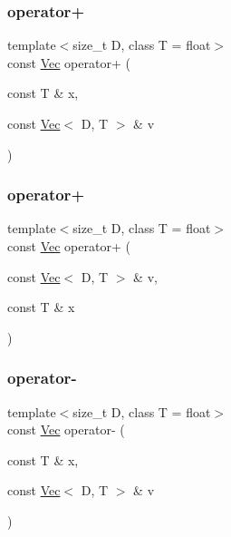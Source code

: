 \subsubsection{\texorpdfstring{operator+}{operator+}\hspace{0.1cm}{\footnotesize\ttfamily [1/2]}}
{\footnotesize\ttfamily template$<$size\+\_\+t D, class T = float$>$ \\
const \hyperlink{classtrimesh_1_1Vec}{Vec} operator+ (\begin{DoxyParamCaption}\item[{const T \&}]{x,  }\item[{const \hyperlink{classtrimesh_1_1Vec}{Vec}$<$ D, T $>$ \&}]{v }\end{DoxyParamCaption})\hspace{0.3cm}{\ttfamily [friend]}}

\mbox{\label{classtrimesh_1_1Vec_affd0d0de91f65f28142428beae224277}} 
\subsubsection{\texorpdfstring{operator+}{operator+}\hspace{0.1cm}{\footnotesize\ttfamily [2/2]}}
{\footnotesize\ttfamily template$<$size\+\_\+t D, class T = float$>$ \\
const \hyperlink{classtrimesh_1_1Vec}{Vec} operator+ (\begin{DoxyParamCaption}\item[{const \hyperlink{classtrimesh_1_1Vec}{Vec}$<$ D, T $>$ \&}]{v,  }\item[{const T \&}]{x }\end{DoxyParamCaption})\hspace{0.3cm}{\ttfamily [friend]}}

\mbox{\label{classtrimesh_1_1Vec_a27d9ec4dc90e0b49a5a17eab7e637834}} 
\subsubsection{\texorpdfstring{operator-\/}{operator-}\hspace{0.1cm}{\footnotesize\ttfamily [1/2]}}
{\footnotesize\ttfamily template$<$size\+\_\+t D, class T = float$>$ \\
const \hyperlink{classtrimesh_1_1Vec}{Vec} operator-\/ (\begin{DoxyParamCaption}\item[{const T \&}]{x,  }\item[{const \hyperlink{classtrimesh_1_1Vec}{Vec}$<$ D, T $>$ \&}]{v }\end{DoxyParamCaption})\hspace{0.3cm}{\ttfamily [friend]}}


